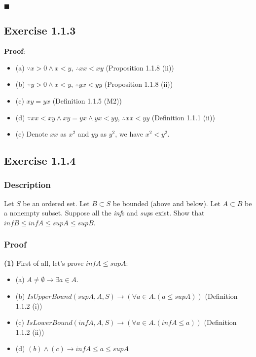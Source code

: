 \documentclass[12pt, letterpaper, oneside]{book}
\begin{document}
$\blacksquare$

\subsection{Exercise 1.1.3}

\textbf{Proof}:
\begin{itemize}
  \item (a) $\because x > 0 \land x < y$, $\therefore xx < xy$ (Proposition 1.1.8 (ii))
  \item (b) $\because y > 0 \land x < y$, $\therefore yx < yy$ (Proposition 1.1.8 (ii))
  \item (c) $xy = yx$ (Definition 1.1.5 (M2))
  \item (d) $\because xx < xy \land xy = yx \land yx < yy$, $\therefore xx < yy$ (Definition 1.1.1 (ii))
  \item (e) Denote $xx$ as $x^2$ and $yy$ as $y^2$, we have $x^2 < y^2$.
\end{itemize}

\subsection{Exercise 1.1.4}

\subsubsection{Description}

Let $S$ be an ordered set. Let $B \subset S$ be bounded (above and below). Let $A \subset B$ be a nonempty subset.
Suppose all the \textit{inf}s and \textit{sup}s exist. Show that $inf B \le inf A \le sup A \le sup B$.

\subsubsection{Proof}

\textbf{(1)} First of all, let's prove $inf A \le sup A$:
\begin{itemize}
  \item (a) $A \ne \emptyset \rightarrow \exists a \in A$.
  \item (b) $IsUpperBound(sup A, A, S) \rightarrow (\forall a \in A. (a \le sup A))$ (Definition 1.1.2 (i))
  \item (c) $IsLowerBound(inf A, A, S) \rightarrow (\forall a \in A. (inf A \le a))$ (Definition 1.1.2 (ii))
  \item (d) $(b) \land (c) \rightarrow inf A \le a \le sup A$
\end{itemize}
\end{document}
